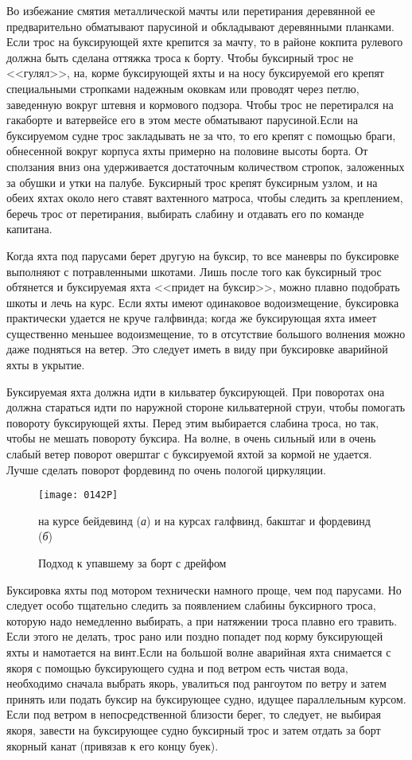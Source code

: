 Во избежание смятия металлической мачты или перетирания деревянной ее предварительно обматывают парусиной и обкладывают деревянными планками. Если трос на буксирующей яхте крепится за мачту, то в районе кокпита рулевого должна быть сделана оттяжка троса к борту. Чтобы буксирный трос не <<гулял>>, на, корме буксирующей яхты и на носу буксируемой его крепят специальными стропками надежным оковкам или проводят через петлю, заведенную вокруг штевня и кормового подзора. Чтобы трос не перетирался на гакаборте и ватервейсе его в этом месте обматывают парусиной.Если на буксируемом судне трос закладывать не за что, то его крепят с помощью браги, обнесенной вокруг корпуса яхты примерно на половине высоты борта. От сползания вниз она удерживается достаточным количеством стропок, заложенных за обушки и утки на палубе. Буксирный трос крепят буксирным узлом, и на обеих яхтах около него ставят вахтенного матроса, чтобы следить за креплением, беречь трос от перетирания, выбирать слабину и отдавать его по команде капитана.

Когда яхта под парусами берет другую на буксир, то все маневры по буксировке выполняют с потравленными шкотами. Лишь после того как буксирный трос обтянется и буксируемая яхта <<придет на буксир>>, можно плавно подобрать шкоты и лечь на курс. Если яхты имеют одинаковое водоизмещение, буксировка практически удается не круче галфвинда; когда же буксирующая яхта имеет существенно меньшее водоизмещение, то в отсутствие большого волнения можно даже подняться на ветер. Это следует иметь в виду при буксировке аварийной яхты в укрытие.

Буксируемая яхта должна идти в кильватер буксирующей. При поворотах она должна стараться идти по наружной стороне кильватерной струи, чтобы помогать повороту буксирующей яхты. Перед этим выбирается слабина троса, но так, чтобы не мешать повороту буксира. На волне, в очень сильный или в очень слабый ветер поворот оверштаг с буксируемой яхтой за кормой не удается. Лучше сделать поворот фордевинд по очень пологой циркуляции.

\begin{figure*}[htb]
  \centering{}
  \texttt{[image: 0142P]}
  \caption{Подход к упавшему за борт с дрейфом}
  \label{fig:142}
  \small
  \centering{}
  на курсе бейдевинд (\textit{а}) и на курсах галфвинд, бакштаг и фордевинд (\textit{б})
\end{figure*}

Буксировка яхты под мотором технически намного проще, чем под парусами. Но следует особо тщательно следить за появлением слабины буксирного троса, которую надо немедленно выбирать, а при натяжении троса плавно его травить. Если этого не делать, трос рано или поздно попадет под корму буксирующей яхты и намотается на винт.Если на большой волне аварийная яхта снимается с якоря с помощью буксирующего судна и под ветром есть чистая вода, необходимо сначала выбрать якорь, увалиться под рангоутом по ветру и затем принять или подать буксир на буксирующее судно, идущее параллельным курсом. Если под ветром в непосредственной близости берег, то следует, не выбирая якоря, завести на буксирующее судно буксирный трос и затем отдать за борт якорный канат (привязав к его концу буек).


